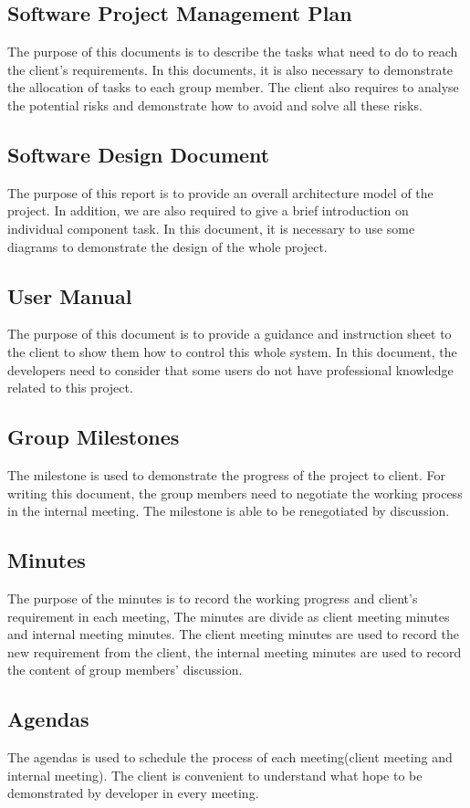 \documentclass[11pt, a4paper]{report}
\begin{document}
\subsection{Software Project Management Plan}
The purpose of this documents is to describe the tasks what need to do to reach the client's requirements. In this documents, it is also necessary to demonstrate the allocation of tasks to each group member. The client also requires to analyse the potential risks and demonstrate how to avoid and solve all these risks. 
\subsection{Software Design Document}
The purpose of this report is to provide an overall architecture model of the project. In addition, we are also required to give a brief introduction on individual component task. In this document, it is necessary to use some diagrams to demonstrate the design of the whole project. 
\subsection{User Manual}
The purpose of this document is to provide a guidance and instruction sheet to the client to show them how to control this whole system. In this document, the developers need to consider that some users do not have professional knowledge related to this project.
\subsection{Group Milestones}
The milestone is used to demonstrate the progress of the project to client. For writing this document, the group members need to negotiate the working process in the internal meeting. The milestone is able to be renegotiated by discussion.
\subsection{Minutes}
The purpose of the minutes is to record the working progress and client's requirement in each meeting, The minutes are divide as client meeting minutes and internal meeting minutes. The client meeting minutes are used to record the new requirement from the client, the internal meeting minutes are used to record the content of group members' discussion.
\subsection{Agendas}
The agendas is used to schedule the process of each meeting(client meeting and internal meeting). The client is convenient to understand what hope to be demonstrated by developer in every meeting.
\end{document}
